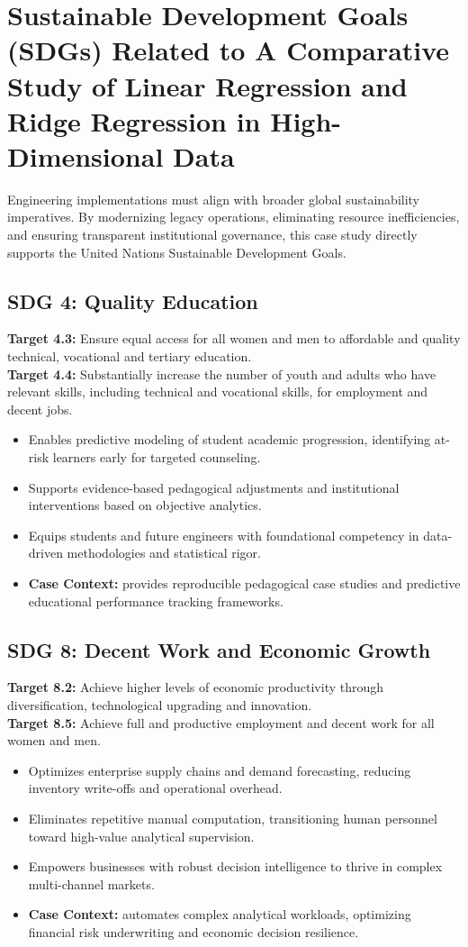 \section{Sustainable Development Goals (SDGs) Related to A Comparative Study of Linear Regression and Ridge Regression in High-Dimensional Data}
Engineering implementations must align with broader global sustainability imperatives. By modernizing legacy operations, eliminating resource inefficiencies, and ensuring transparent institutional governance, this case study directly supports the United Nations Sustainable Development Goals.

\subsection{SDG 4: Quality Education}
\noindent\textbf{Target 4.3:} Ensure equal access for all women and men to affordable and quality technical, vocational and tertiary education. \\
\noindent\textbf{Target 4.4:} Substantially increase the number of youth and adults who have relevant skills, including technical and vocational skills, for employment and decent jobs.
\begin{itemize}
  \item Enables predictive modeling of student academic progression, identifying at-risk learners early for targeted counseling.
  \item Supports evidence-based pedagogical adjustments and institutional interventions based on objective analytics.
  \item Equips students and future engineers with foundational competency in data-driven methodologies and statistical rigor.
  \item \textbf{Case Context:} provides reproducible pedagogical case studies and predictive educational performance tracking frameworks.
\end{itemize}

\subsection{SDG 8: Decent Work and Economic Growth}
\noindent\textbf{Target 8.2:} Achieve higher levels of economic productivity through diversification, technological upgrading and innovation. \\
\noindent\textbf{Target 8.5:} Achieve full and productive employment and decent work for all women and men.
\begin{itemize}
  \item Optimizes enterprise supply chains and demand forecasting, reducing inventory write-offs and operational overhead.
  \item Eliminates repetitive manual computation, transitioning human personnel toward high-value analytical supervision.
  \item Empowers businesses with robust decision intelligence to thrive in complex multi-channel markets.
  \item \textbf{Case Context:} automates complex analytical workloads, optimizing financial risk underwriting and economic decision resilience.
\end{itemize}

